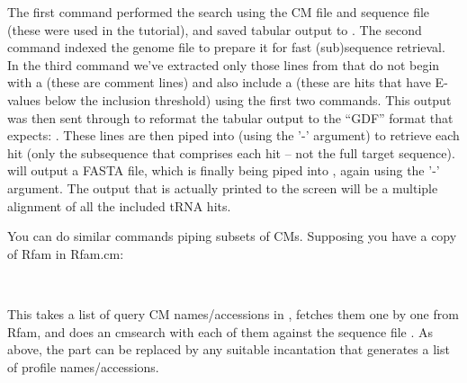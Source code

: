 The first command performed the search using the CM file
 and sequence file  (these
were used in the tutorial), and saved tabular output to
.  The second command indexed the genome
file to prepare it for fast (sub)sequence retrieval. In the third
command we've extracted only those lines from
 that do not begin with a \prog{\#} (these
are comment lines) and also include a \prog{!} (these are hits that
have E-values below the inclusion threshold) using the first two
 commands. This output was then sent through  to
reformat the tabular output to the ``GDF'' format that
 expects: .  These lines are then piped into  (using
the '-' argument) to retrieve each hit (only the subsequence that
comprises each hit -- not the full target sequence). 
will output a FASTA file, which is finally being piped into
, again using the '-' argument. The output that is
actually printed to the screen will be a multiple alignment of all the
included tRNA hits.

You can do similar commands piping subsets of CMs. Supposing you have a copy of Rfam in Rfam.cm:

 \\ 

This takes a list of query CM names/accessions in
, fetches them one by one from Rfam, and does an
cmsearch with each of them against the sequence file
. As above, the  part
can be replaced by any suitable incantation that generates a list of
profile names/accessions.

